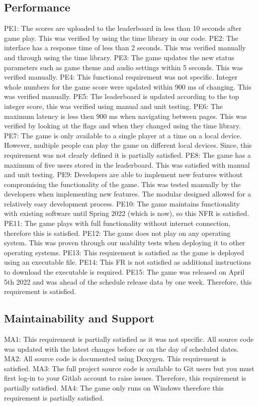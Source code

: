 \documentclass[12pt, titlepage]{article}
\begin{document}
	\subsection{Performance}
	PE1: The scores are uploaded to the leaderboard in less than 10 seconds after game play. This was verified by using the time library in our code. 
	PE2: The interface has a response time of less than 2 seconds. This was verified manually and through using the time library.   
	PE3: The game updates the new status parameters such as game theme and audio settings within 5 seconds. This was verified manually. 
	PE4: This functional requirement was not specific. Integer whole numbers for the game score were updated within 900 ms of changing. This was verified manually. 
	PE5: The leaderboard is updated according to the top integer score, this was verified using manual and unit testing. 
	PE6: The maximum latency is less then 900 ms when navigating between pages. This was verified by looking at the flags and when they changed using the time library. 
	PE7: The game is only available to a single player at a time on a local device. However, multiple people can play the game on different local devices. Since, this requirement was not clearly defined it is partially satisfied. 
	PE8: The game has a maximum of five users stored in the leaderboard. This was satisfied with manual and unit testing.
	PE9: Developers are able to implement new features without compromising the functionality of the game. This was tested manually by the developers when implementing new features. The modular designed allowed for a relatively easy development process. 
	PE10: The game maintains functionality with existing software until Spring 2022 (which is now), so this NFR is satisfied. 
	PE11: The game plays with full functionality without internet connection, therefore this is satisfied. 
	PE12: The game does not play on any operating system. This was proven through our usability tests when deploying it to other operating systems. 
	PE13: This requirement is satisfied as the game is deployed using an executable file. 
	PE14: This FR is not satisfied as additional instructions to download the executable is required. 
	PE15: The game was released on April 5th 2022 and was ahead of the schedule release data by one week. Therefore, this requirement is satisfied. 
	
	\subsection{Maintainability and Support}
	MA1: This requirement is partially satisfied as it was not specific. All source code was updated with the latest changes before or on the day of scheduled dates. 
	MA2: All source code is documented using Doxygen. This requirement is satisfied. 
	MA3: The full project source code is available to Git users but you must first log-in to your Gitlab account to raise issues. Therefore, this requirement is partially satisfied. 
	MA4: The game only runs on Windows therefore this requirement is partially satisfied. 
	
\end{document}
